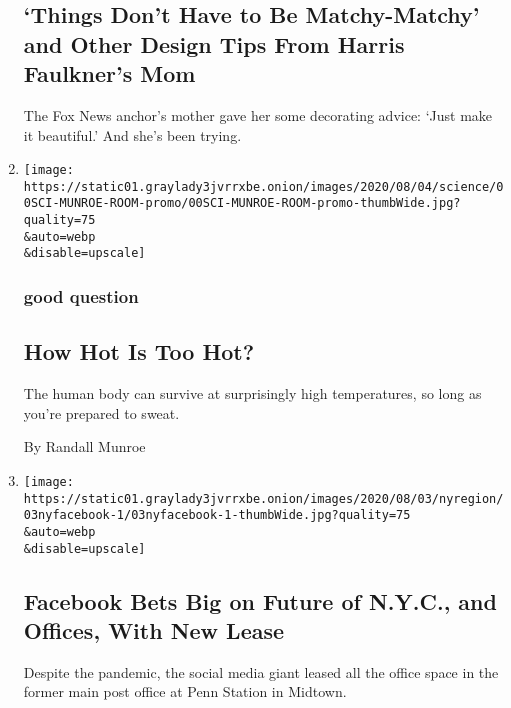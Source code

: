 \begin{enumerate}
  \hypertarget{things-dont-have-to-be-matchy-matchy-and-other-design-tips-from-harris-faulkners-mom}{%
  \subsection{`Things Don't Have to Be Matchy-Matchy' and Other Design
  Tips From Harris Faulkner's
  Mom}\label{things-dont-have-to-be-matchy-matchy-and-other-design-tips-from-harris-faulkners-mom}}

  The Fox News anchor's mother gave her some decorating advice: `Just
  make it beautiful.' And she's been trying.
\item
  \href{/2020/08/04/science/randall-munroe-xkcd-temperature.html}{}

  \texttt{[image: https://static01.graylady3jvrrxbe.onion/images/2020/08/04/science/00SCI-MUNROE-ROOM-promo/00SCI-MUNROE-ROOM-promo-thumbWide.jpg?quality=75\\\&auto=webp\\\&disable=upscale]}

  \hypertarget{good-question}{%
  \subsubsection{good question}\label{good-question}}

  \hypertarget{how-hot-is-too-hot}{%
  \subsection{How Hot Is Too Hot?}\label{how-hot-is-too-hot}}

  The human body can survive at surprisingly high temperatures, so long
  as you're prepared to sweat.

  By Randall Munroe
\item
  \href{/2020/08/03/nyregion/facebook-nyc-office-farley-building.html}{}

  \texttt{[image: https://static01.graylady3jvrrxbe.onion/images/2020/08/03/nyregion/03nyfacebook-1/03nyfacebook-1-thumbWide.jpg?quality=75\\\&auto=webp\\\&disable=upscale]}

  \hypertarget{facebook-bets-big-on-future-of-nyc-and-offices-with-new-lease}{%
  \subsection{Facebook Bets Big on Future of N.Y.C., and Offices, With
  New
  Lease}\label{facebook-bets-big-on-future-of-nyc-and-offices-with-new-lease}}

  Despite the pandemic, the social media giant leased all the office
  space in the former main post office at Penn Station in Midtown.


\end{enumerate}
